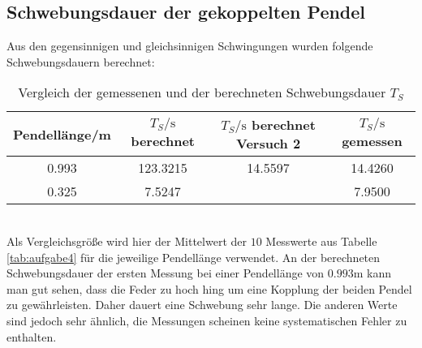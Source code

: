     \subsection{Schwebungsdauer der gekoppelten Pendel}
      Aus den gegensinnigen und gleichsinnigen Schwingungen wurden folgende Schwebungsdauern berechnet:
      \begin{table}
        \centering
          \caption{Vergleich der gemessenen und der berechneten Schwebungsdauer $T_{S}$}
            \label{tab:aufgabe6}
            \begin{tabular}{S S S S}
              \toprule
              {Pendellänge/m} & {$T_{S}/\si{\second}$ berechnet} & {$T_{S}/\si{\second}$ berechnet Versuch 2} & {$T_{S}/\si{\second}$ gemessen} \\
                 &   123.3215 & 14.5597 &  14.4260\\
              0.325   &   7.5247 &           &  7.9500\\
              \bottomrule
            \end{tabular}
          \end{table}
      \\
      Als Vergleichsgröße wird hier der Mittelwert der $10$ Messwerte aus Tabelle \ref{tab:aufgabe4} für die jeweilige
      Pendellänge verwendet.
      An der berechneten Schwebungsdauer der ersten Messung bei einer Pendellänge von $0.993$m kann man gut sehen,
      dass die Feder zu hoch hing um eine Kopplung der beiden Pendel zu gewährleisten. Daher dauert eine Schwebung
      sehr lange. Die anderen Werte sind jedoch sehr ähnlich, die Messungen scheinen keine systematischen Fehler zu enthalten.
\label{sec:Auswertung}
